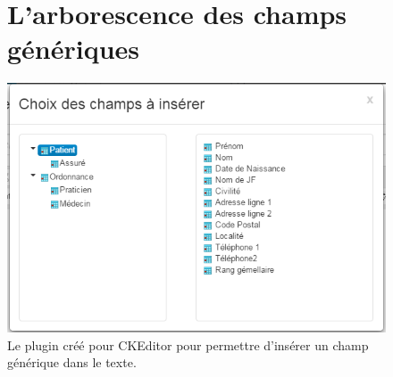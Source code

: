 \begin{appendices}
\newpage
\begin{figure}[H]
	\section*{L'arborescence des champs génériques}
	\centering
	\includegraphics[width=14cm]{./img/arbo}
	\caption{\label{fig:editeur_arbo} Le plugin créé pour CKEditor pour permettre d'insérer un champ générique dans le texte.}
\end{figure}

\newpage
\begin{figure}[H]

\end{figure}
\end{appendices}
